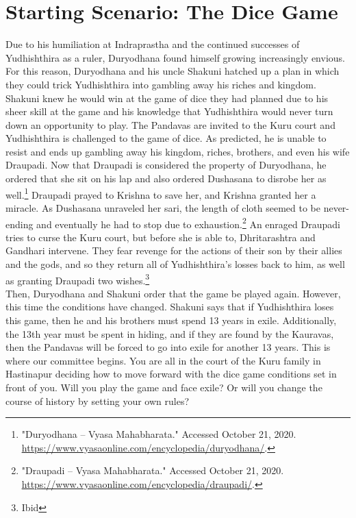 \documentclass[10pt, letterpaper]{article}
\begin{document}
\newpage
\section{Starting Scenario: The Dice Game}

Due to his humiliation at Indraprastha and the continued successes of
Yudhishthira as a ruler, Duryodhana found himself growing increasingly
envious. For this reason, Duryodhana and his uncle Shakuni hatched up a
plan in which they could trick Yudhishthira into gambling away his
riches and kingdom. Shakuni knew he would win at the game of dice they
had planned due to his sheer skill at the game and his knowledge that
Yudhishthira would never turn down an opportunity to play. The Pandavas
are invited to the Kuru court and Yudhishthira is challenged to the game
of dice. As predicted, he is unable to resist and ends up gambling away
his kingdom, riches, brothers, and even his wife Draupadi. Now that
Draupadi is considered the property of Duryodhana, he ordered that she
sit on his lap and also ordered Dushasana to disrobe her as
well.\footnote{"Duryodhana -- Vyasa Mahabharata." Accessed October 21,
  2020.
  \href{https://www.vyasaonline.com/encyclopedia/duryodhana/}{\underline{https://www.vyasaonline.com/encyclopedia/duryodhana/}}.}
Draupadi prayed to Krishna to save her, and Krishna granted her a
miracle. As Dushasana unraveled her sari, the length of cloth seemed to
be never-ending and eventually he had to stop due to
exhaustion.\footnote{"Draupadi -- Vyasa Mahabharata." Accessed October
  21, 2020.
  \href{https://www.vyasaonline.com/encyclopedia/draupadi/}{\underline{https://www.vyasaonline.com/encyclopedia/draupadi/}}.}
An enraged Draupadi tries to curse the Kuru court, but before she is
able to, Dhritarashtra and Gandhari intervene. They fear revenge for the
actions of their son by their allies and the gods, and so they return
all of Yudhishthira's losses back to him, as well as granting Draupadi
two wishes.\footnote{Ibid} \\

Then, Duryodhana and Shakuni order that the game be played again.
However, this time the conditions have changed. Shakuni says that if
Yudhishthira loses this game, then he and his brothers must spend 13
years in exile. Additionally, the 13th year must be spent in hiding, and
if they are found by the Kauravas, then the Pandavas will be forced to
go into exile for another 13 years. This is where our committee begins.
You are all in the court of the Kuru family in Hastinapur deciding how
to move forward with the dice game conditions set in front of you. Will
you play the game and face exile? Or will you change the course of
history by setting your own rules? \\
\end{document}
